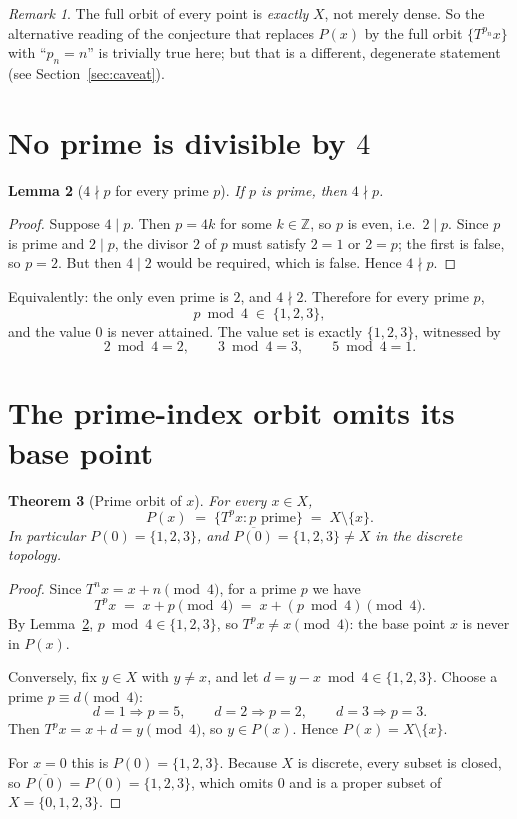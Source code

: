 \documentclass[11pt]{article}
\newtheorem{theorem}{Theorem}
\newtheorem{lemma}[theorem]{Lemma}
\theoremstyle{definition}
\theoremstyle{remark}
\newtheorem{remark}[theorem]{Remark}
\newcommand{\Z}{\mathbb{Z}}
\begin{document}
\begin{remark}
The full orbit of every point is \emph{exactly} $X$, not merely dense. So the
alternative reading of the conjecture that replaces $P(x)$ by the full orbit
$\{T^{p_n}x\}$ with ``$p_n = n$'' is trivially true here; but that is a
different, degenerate statement (see Section~\ref{sec:caveat}).
\end{remark}

\section{No prime is divisible by $4$}

\begin{lemma}[$4 \nmid p$ for every prime $p$]
\label{lem:four}
If $p$ is prime, then $4 \nmid p$.
\end{lemma}

\begin{proof}
Suppose $4 \mid p$. Then $p = 4k$ for some $k \in \Z$, so $p$ is even, i.e.\
$2 \mid p$. Since $p$ is prime and $2 \mid p$, the divisor $2$ of $p$ must
satisfy $2 = 1$ or $2 = p$; the first is false, so $p = 2$. But then
$4 \mid 2$ would be required, which is false. Hence $4 \nmid p$.
\end{proof}

Equivalently: the only even prime is $2$, and $4 \nmid 2$. Therefore for every
prime $p$,
\[
p \bmod 4 \;\in\; \{1, 2, 3\},
\]
and the value $0$ is never attained. The value set is exactly $\{1,2,3\}$,
witnessed by
\[
2 \bmod 4 = 2, \qquad 3 \bmod 4 = 3, \qquad 5 \bmod 4 = 1 .
\]

\section{The prime-index orbit omits its base point}

\begin{theorem}[Prime orbit of $x$]
\label{thm:prime}
For every $x \in X$,
\[
P(x) \;=\; \{T^p x : p \text{ prime}\} \;=\; X \setminus \{x\}.
\]
In particular $P(0) = \{1,2,3\}$, and $\overline{P(0)} = \{1,2,3\} \neq X$ in
the discrete topology.
\end{theorem}

\begin{proof}
Since $T^n x = x + n \pmod 4$, for a prime $p$ we have
\[
T^p x \;=\; x + p \pmod 4 \;=\; x + (p \bmod 4) \pmod 4 .
\]
By Lemma~\ref{lem:four}, $p \bmod 4 \in \{1,2,3\}$, so
$T^p x \neq x \pmod 4$: the base point $x$ is never in $P(x)$.

Conversely, fix $y \in X$ with $y \neq x$, and let $d = y - x \bmod 4 \in
\{1,2,3\}$. Choose a prime $p \equiv d \pmod 4$:
\[
d = 1 \Rightarrow p = 5, \qquad d = 2 \Rightarrow p = 2, \qquad
d = 3 \Rightarrow p = 3 .
\]
Then $T^p x = x + d = y \pmod 4$, so $y \in P(x)$. Hence
$P(x) = X \setminus \{x\}$.

For $x = 0$ this is $P(0) = \{1,2,3\}$. Because $X$ is discrete, every subset
is closed, so $\overline{P(0)} = P(0) = \{1,2,3\}$, which omits $0$ and is a
proper subset of $X = \{0,1,2,3\}$.
\end{proof}
\end{document}
